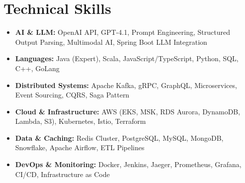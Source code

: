 \documentclass[letterpaper,10.5pt]{article}
\begin{document}
\section{Technical Skills}
  \begin{itemize}[leftmargin=*, itemsep=1pt, parsep=0pt, topsep=0pt]
    \item \textbf{AI \& LLM:} OpenAI API, GPT-4.1, Prompt Engineering, Structured Output Parsing, Multimodal AI, Spring Boot LLM Integration
    \item \textbf{Languages:} Java (Expert), Scala, JavaScript/TypeScript, Python, SQL, C++, GoLang
    \item \textbf{Distributed Systems:} Apache Kafka, gRPC, GraphQL, Microservices, Event Sourcing, CQRS, Saga Pattern
    \item \textbf{Cloud \& Infrastructure:} AWS (EKS, MSK, RDS Aurora, DynamoDB, Lambda, S3), Kubernetes, Istio, Terraform
    \item \textbf{Data \& Caching:} Redis Cluster, PostgreSQL, MySQL, MongoDB, Snowflake, Apache Airflow, ETL Pipelines
    \item \textbf{DevOps \& Monitoring:} Docker, Jenkins, Jaeger, Prometheus, Grafana, CI/CD, Infrastructure as Code
  \end{itemize}

\end{document}
